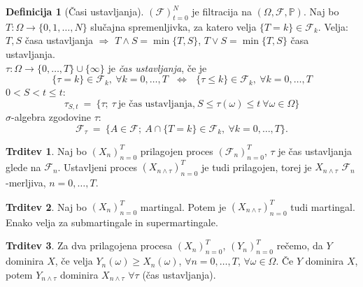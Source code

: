 \documentclass[11pt]{article}
\newcommand{\p}{\mathbb{P}}
\newcommand{\F}{\mathcal{F}}
\newcommand{\1}{\mathbbm{1}}
\theoremstyle{definition}
\newtheorem{definicija}{Definicija}[section]
\theoremstyle{definition}
\newtheorem{trditev}{Trditev}[section]
\begin{document}
\begin{definicija}[Časi ustavljanja]

$(\F)_{t=0}^N$ je filtracija na $(\Omega, \F, \p)$. Naj bo $T: \Omega \rightarrow \{0, 1, \ldots, N\}$ slučajna spremenljivka, za katero velja $\{T = k\} \in \F_k$. Velja: $T, S$ časa ustavljanja $\Longrightarrow$ $T \land S = \min\{T, S\}$, $T \lor S = \min\{T, S\}$ časa ustavljanja. \\

\noindent $\tau: \Omega \rightarrow \{0,\ldots, T\} \cup \{\infty\}$ je \textit{čas ustavljanja}, če je
$$\{\tau = k\} \in \F_k, ~\forall k = 0,\ldots, T ~~~\iff~~~ \{\tau \leq k\} \in \F_k, ~\forall k = 0,\ldots, T$$
$0 < S < t \leq t$:
$$\tau_{S, t} ~=~ \{\tau; ~\tau ~\text{je čas ustavljanja,}~ S \leq \tau(\omega) \leq t ~\forall \omega \in \Omega\}$$
$\sigma$-algebra zgodovine $\tau$:
$$\F_\tau ~=~ \{A \in \F; ~A \cap \{T=k\} \in \F_k, ~\forall k = 0,\ldots, T\}.$$

\end{definicija}
\vspace{0.5cm}

\begin{trditev}

Naj bo $(X_n)_{n=0}^T$ prilagojen proces $(\F_n)_{n=0}^T$, $\tau$ je čas ustavljanja glede na $\F_n$. Ustavljeni proces $(X_{n \land \tau})_{n=0}^T$ je tudi prilagojen, torej je $X_{n \land \tau}$ $\F_n$-merljiva, $n = 0, \ldots, T$.

\end{trditev}
\vspace{0.5cm}

\begin{trditev}

Naj bo $(X_n)_{n=0}^T$ martingal. Potem je $(X_{n \land \tau})_{n=0}^T$ tudi martingal. Enako velja za submartingale in supermartingale.

\end{trditev}
\vspace{0.5cm}

\begin{trditev}

Za dva prilagojena procesa $(X_n)_{n=0}^T$, $(Y_n)_{n=0}^T$ rečemo, da $Y$ dominira $X$, če velja $Y_n(\omega) \geq X_n(\omega)$, $\forall n = 0, \ldots, T$, $\forall \omega \in \Omega$. Če $Y$ dominira $X$, potem $Y_{n \land \tau}$ dominira $X_{n \land \tau}$ $\forall \tau$ (čas ustavljanja).

\end{trditev}
\vspace{0.5cm}
\end{document}
